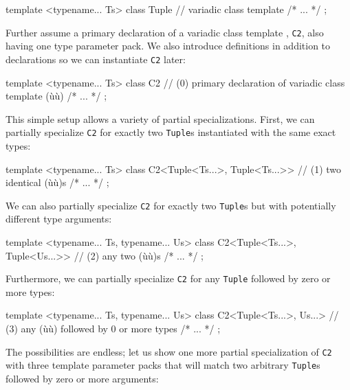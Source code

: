 \begin{emcppslisting}
template <typename... Ts> class Tuple  // variadic class template
{ /* ... */ };
\end{emcppslisting}
    

\noindent Further assume a primary declaration of a variadic class template ,
\lstinline!C2!, also having one type parameter pack. We also introduce
definitions in addition to declarations so we can instantiate
\lstinline!C2! later:

\begin{emcppslisting}
template <typename... Ts> class C2
    // (0) primary declaration of variadic class template (ù{}ù)
{ /* ... */ };
\end{emcppslisting}
    

\noindent This simple setup allows a variety of partial specializations. First, we
can partially specialize \lstinline!C2! for exactly two \lstinline!Tuple!s
instantiated with the same exact types:

\begin{emcppslisting}
template <typename... Ts>
class C2<Tuple<Ts...>, Tuple<Ts...>>  // (1) two identical (ù{}ù)s
{ /* ... */ };
\end{emcppslisting}
    

\noindent We can also partially specialize \lstinline!C2! for exactly two
\lstinline!Tuple!s but with potentially different type arguments:

\begin{emcppslisting}
template <typename... Ts, typename... Us>
class C2<Tuple<Ts...>, Tuple<Us...>>  // (2) any two (ù{}ù)s
{ /* ... */ };
\end{emcppslisting}
    

\noindent Furthermore, we can partially specialize \lstinline!C2! for any
\lstinline!Tuple! followed by zero or more types:

\begin{emcppslisting}
template <typename... Ts, typename... Us>
class C2<Tuple<Ts...>, Us...>  // (3) any (ù{}ù) followed by 0 or more types
{ /* ... */ };
\end{emcppslisting}
    

\noindent The possibilities are endless; let us show one more partial
specialization of \lstinline!C2! with three template parameter packs that
will match two arbitrary \lstinline!Tuple!s followed by zero or more
arguments:

